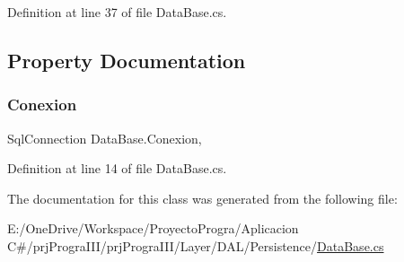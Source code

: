 Definition at line 37 of file Data\+Base.\+cs.



\subsection{Property Documentation}
\hypertarget{class_data_base_a97f57bd5cc885dcd4bb9df4ee4de305d}{}\label{class_data_base_a97f57bd5cc885dcd4bb9df4ee4de305d} 
\subsubsection{\texorpdfstring{Conexion}{Conexion}}
{\footnotesize\ttfamily Sql\+Connection Data\+Base.\+Conexion\hspace{0.3cm}{\ttfamily [get]}, {\ttfamily [set]}}



Definition at line 14 of file Data\+Base.\+cs.



The documentation for this class was generated from the following file\+:\begin{DoxyCompactItemize}
\item 
E\+:/\+One\+Drive/\+Workspace/\+Proyecto\+Progra/\+Aplicacion C\#/prj\+Progra\+I\+I\+I/prj\+Progra\+I\+I\+I/\+Layer/\+D\+A\+L/\+Persistence/\hyperlink{_data_base_8cs}{Data\+Base.\+cs}\end{DoxyCompactItemize}
